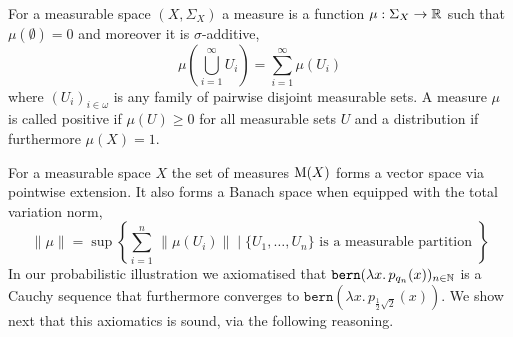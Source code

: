 \documentclass[a4paper,UKenglish,cleveref, autoref, thm-restate]{lipics-v2021}
\begin{document}
\begin{definition} For a measurable space $(X,\Sigma_X)$ a measure is a
        function $\mu : \Sigma_X \to \mathbb{R}$ such that $\mu(\emptyset) = 0$ and
        moreover it is $\sigma$-additive, \ie\ 
        \[
        \mu \left (\bigcup_{i =1}^{\infty} U_i \right ) = \sum_{i = 1}^{\infty}
        \mu(U_i) 
        \] 
where $(U_i)_{i \in \omega}$ is any family of pairwise disjoint measurable
sets.  A measure $\mu$ is called positive if $\mu(U) \geq 0$ for all measurable
sets $U$ and a distribution if furthermore $\mu(X) =1$.  
\end{definition}
For a measurable space $X$ the set of measures $\mathrm{M}(X)$ forms a vector space
via pointwise extension. It also forms a Banach space when equipped with the
total variation norm,
\[
        \lVert \mu \rVert = 
        \sup \left \{ \sum_{i = 1}^n \, \lVert \mu(U_i) \rVert \mid
             \{ U_1, \dots, U_n \} \text{ is a measurable partition }
        \right \}
\]
In our probabilistic illustration we axiomatised that $\mathtt{bern}(\lambda x.
\, p_{q_n}(x))_{n \in \mathbb{N}}$ is a Cauchy sequence that furthermore converges
to $\mathtt{bern}(\lambda x. \, p_{\frac{1}{2}\sqrt{2}}(x))$. We show next that
this axiomatics is sound, via the following reasoning.
\end{document}
